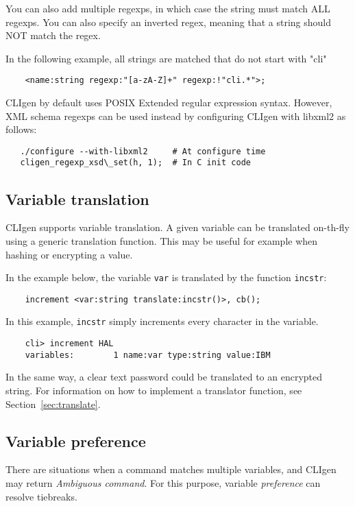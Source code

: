 \documentclass[a4paper, 10pt] {article}
\begin{document}
You can also add multiple regexps, in which case the string must match ALL regexps. You can also specify an inverted regex, meaning that a string should NOT match the regex.

In the following example, all strings are matched that do not start with "cli"
\begin{verbatim}
    <name:string regexp:"[a-zA-Z]+" regexp:!"cli.*">;
\end{verbatim}

CLIgen by default uses POSIX Extended regular expression syntax.
However, XML schema regexps can be used instead by configuring CLIgen with libxml2 as follows:
\begin{verbatim}
   ./configure --with-libxml2     # At configure time
   cligen_regexp_xsd\_set(h, 1);  # In C init code
\end{verbatim}

\subsection{Variable translation}

CLIgen supports variable translation. A given variable can be
translated on-th-fly using a generic translation function. This may be useful for example when hashing or encrypting a value.

In the example below, the variable {\tt var} is translated by the function {\tt incstr}:
\begin{verbatim}
    increment <var:string translate:incstr()>, cb();
\end{verbatim}

In this example, {\tt incstr} simply increments every character in the variable.
\begin{verbatim}
    cli> increment HAL
    variables:        1 name:var type:string value:IBM
\end{verbatim}

In the same way, a clear text password could be translated to an encrypted string.
For information on how to implement a translator function, see Section~\ref{sec:translate}.


\subsection{Variable preference}

There are situations when a command matches multiple variables, and CLIgen may return {\em Ambiguous command}. For this purpose, variable {\em preference} can resolve
tiebreaks.
\end{document}
